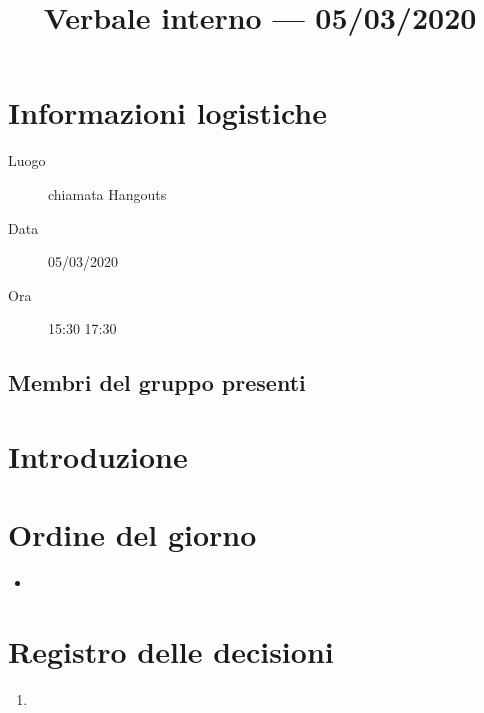 \documentclass{article}
\title{Verbale interno --- 05/03/2020}
\begin{document}


\section{Informazioni logistiche}%
\label{sec:informazioni_logistiche}

\begin{description}
  \item [Luogo] chiamata Hangouts
  \item [Data] 05/03/2020
  \item [Ora] 15:30  17:30
\end{description}

\subsection{Membri del gruppo presenti}%
\label{sub:membri_del_gruppo_presenti}

\begin{enumerate}
\end{enumerate}

\section{Introduzione}%
\label{sec:introduzione}

\placeholder{\dots}

\section{Ordine del giorno}%
\label{sec:ordine_del_giorno}

\begin{itemize}
  \item \placeholder{\dots}
\end{itemize}


\newpage
\section{Registro delle decisioni}%
\label{sec:registro_delle_decisioni}

\begin{enumerate}
  \item \placeholder{\dots}
\end{enumerate}

\end{document}

